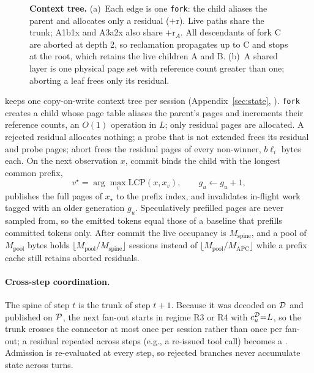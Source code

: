 \begin{figure}[t]
\centering
\resizebox{\textwidth}{!}{}
\caption{\textbf{Context tree.}
(a)~Each edge is one \texttt{fork}: the child aliases the parent and allocates only a residual ($+$r).
Live paths share the trunk; A1b1x and A3a2x also share $+$r$_A$.
All descendants of fork C are aborted at depth 2, so reclamation propagates up to C and stops at the root, which retains the live children A and B.
(b)~A shared layer is one physical page set with reference count greater than one; aborting a leaf frees only its residual.}
\label{fig:tree}
\end{figure}

\sys keeps one copy-on-write context tree per session (Appendix~\ref{sec:state}, ).
\texttt{fork} creates a child whose page table aliases the parent's pages and increments their reference counts, an $O(1)$ operation in $L$; only residual pages are allocated.
A rejected residual allocates nothing; a probe that is not extended frees its residual and probe pages; abort frees the residual pages of every non-winner, $b\ell_i$ bytes each.
On the next observation $x$, commit binds the child with the longest common prefix,
\begin{equation}
\label{eq:lcp}
v^\star=\arg\max_{v}\mathrm{LCP}(x,x_v),\qquad g_u\leftarrow g_u+1,
\end{equation}
publishes the full pages of $x_\star$ to the prefix index, and invalidates in-flight work tagged with an older generation $g_u$.
Speculatively prefilled pages are never sampled from, so the emitted tokens equal those of a baseline that prefills committed tokens only.
After commit the live occupancy is $M_{\mathrm{spine}}$, and a pool of $M_{\mathrm{pool}}$ bytes holds $\lfloor M_{\mathrm{pool}}/M_{\mathrm{spine}}\rfloor$ sessions instead of $\lfloor M_{\mathrm{pool}}/M_{\mathrm{APC}}\rfloor$ while a prefix cache still retains aborted residuals.

\paragraph{Cross-step coordination.}
The spine of step $t$ is the trunk of step $t{+}1$.
Because it was decoded on $\mathcal{D}$ and published on $\mathcal{P}$, the next fan-out starts in regime R3 or R4 with $c_u^{\mathcal{D}}{=}L$, so the trunk crosses the connector at most once per session rather than once per fan-out; a residual repeated across steps (e.g., a re-issued tool call) becomes a \Hit.
Admission is re-evaluated at every step, so rejected branches never accumulate state across turns.

